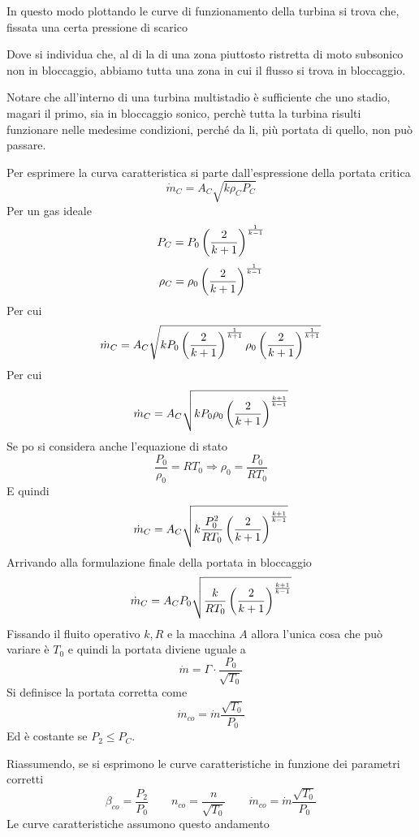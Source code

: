 \documentclass[a4paper, 15pt]{article}
\begin{document}
\begin{adjustwidth}{2in}{}
	In questo modo plottando le curve di funzionamento della turbina si trova che, fissata una certa pressione di scarico
	
	
	Dove si individua che, al di la di una zona piuttosto ristretta di moto subsonico non in bloccaggio, abbiamo tutta una zona in cui il flusso si trova in bloccaggio.
	
	Notare che all'interno di una turbina multistadio è sufficiente che uno stadio, magari il primo, sia in bloccaggio sonico, perchè tutta la turbina risulti funzionare nelle medesime condizioni, perché da li, più portata di quello, non può passare. \newline 
	
	Per esprimere la curva caratteristica si parte dall'espressione della portata critica 
	\[\dot{m}_C =A_C\sqrt{k\rho_CP_C}\]
	Per un gas ideale 
	\[P_C = P_0\left(\dfrac{2}{k+1}\right)^{1\over k-1} \]
	\[\rho_C = \rho_0\left(\dfrac{2}{k+1}\right)^{1\over k-1}\]
	Per cui
	\[\dot{m}_C =A_C\sqrt{kP_0\left(\dfrac{2}{k+1}\right)^{1\over k+1}\rho_0\left(\dfrac{2}{k+1}\right)^{1\over k+1}}\]
	Per cui
	\[\dot{m}_C =A_C\sqrt{kP_0\rho_0\left(\dfrac{2}{k+1}\right)^{k+1\over k-1}}\]
	Se po si considera anche l'equazione di stato
	\[\dfrac{P_0}{\rho_0} = RT_0 \Rightarrow \rho_0 = \dfrac{P_0}{RT_0}\]
	E quindi
	\[\dot{m}_C =A_C\sqrt{k\dfrac{P^2_0}{RT_0}\left(\dfrac{2}{k+1}\right)^{k+1\over k-1}}\]
	Arrivando alla formulazione finale della portata in bloccaggio 
	\[\dot{m}_C =A_CP_0\sqrt{\dfrac{k}{RT_0}\left(\dfrac{2}{k+1}\right)^{k+1\over k-1}}\] 
	Fissando il fluito operativo $k, R$ e la macchina $A$ allora l'unica cosa che può variare è $T_0$ e quindi la portata diviene uguale a 
	\[\dot{m} = \Gamma \cdot \dfrac{P_0}{\sqrt{T_0}}\]
	Si definisce la portata corretta come
	\[\dot{m}_{co} = \dot{m}\dfrac{\sqrt{T_0}}{P_0}\]
	Ed è costante se $P_2\leq P_C$. \newline 
	
	Riassumendo, se si esprimono le curve caratteristiche in funzione dei parametri corretti 
	\[\beta_{co} = \dfrac{P_2}{P_0}\qquad n_{co} = \dfrac{n}{\sqrt{T_0}} \qquad \dot{m}_{co} = \dot{m}\dfrac{\sqrt{T_0}}{P_0}\]
	Le curve caratteristiche assumono questo andamento
	

\end{adjustwidth}
\end{document}
